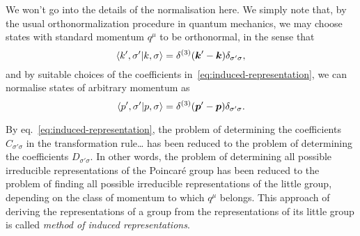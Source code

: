 We won't go into the details of the normalisation here. We simply note that, by the usual orthonormalization procedure in quantum mechanics, we may choose states with standard momentum $q^\mu$ to be orthonormal, in the sense that
\begin{equation}
    \braket{k',\sigma'}{k,\sigma} = \delta^{(3)}(\boldsymbol{k}' - \boldsymbol{k}) \delta_{\sigma'\sigma} ,
\end{equation}
and by suitable choices of the coefficients in~\eqref{eq:induced-representation}, we can normalise states of arbitrary momentum as
\begin{equation}
    \braket{p',\sigma'}{p,\sigma} = \delta^{(3)}(\boldsymbol{p}' - \boldsymbol{p}) \delta_{\sigma'\sigma} .
\end{equation}

By eq.~\eqref{eq:induced-representation}, the problem of determining the coefficients $C_{\sigma'\sigma}$ in the transformation rule\color{red}\dots\color{black} has been reduced to the problem of determining the coefficients $D_{\sigma'\sigma}$. In other words, the problem of determining all possible irreducible representations of the Poincaré group has been reduced to the problem of finding all possible irreducible representations of the little group, depending on the class of momentum to which $q^\mu$ belongs. This approach of deriving the representations of a group from the representations of its little group is called \emph{method of induced representations}.


